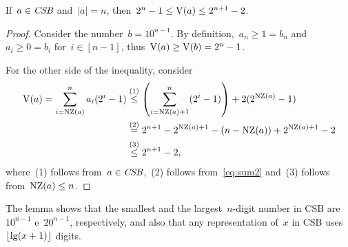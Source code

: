 \documentclass[main.tex]{subfiles}
\begin{document}
\begin{lemma} \label{lem:csbdig}
    If~$a \in \textit{CSB}$ and~$|a| = n$, then~$2^n - 1 \leq \operatorname{V}(a) \leq 2^{n+1}-2$.
\end{lemma}
\begin{proof}
    Consider the number~$b = 10^{n-1}$. By definition,~$a_n \geq 1 = b_n$ and~$a_i \geq 0 = b_i$ for~$i \in [n - 1]$, thus~$\operatorname{V}(a) \geq \operatorname{V}(b) = 2^n - 1$.

    For the other side of the inequality, consider
	\begin{align*}
	\operatorname{V}(a) = \sum\limits_{i = \operatorname{NZ}(a)}^n{a_i (2^i - 1)} &\stackrel{\text{(1)}}{\leq} \left(\sum\limits_{i = \operatorname{NZ}(a) + 1}^n (2^i - 1)\right) + 2 (2^{\operatorname{NZ}(a)} - 1) \\
	&\stackrel{\text{(2)}}{=} 2^{n+1} - 2^{\operatorname{NZ}(a)+1} - (n - \operatorname{NZ}(a)) + 2^{\operatorname{NZ}(a) + 1} - 2 \\
	&\stackrel{\text{(3)}}{\leq} 2^{n+1} - 2,
	\end{align*}
	where~(1) follows from~$a \in \textit{CSB}$,~(2) follows from~\eqref{eq:sum2} and~(3) follows from~$\operatorname{NZ}(a) \leq n$.
\end{proof}

The lemma shows that the smallest and the largest~$n$-digit number in CSB are~$10^{n-1}$ e~$20^{n-1}$, respectively, and also that any representation of~$x$ in CSB uses~$\lfloor\lg(x + 1)\rfloor$ digits.
\end{document}
